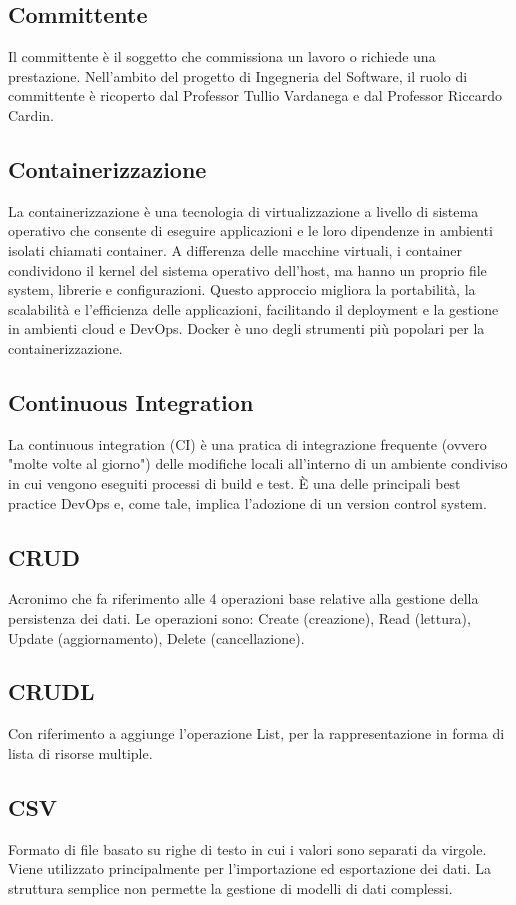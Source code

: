 \vspace{2em}
\subsection*{Committente}
Il committente è il soggetto che commissiona un lavoro o richiede una prestazione. Nell’ambito del progetto di Ingegneria del Software, il ruolo di committente è ricoperto dal Professor Tullio Vardanega e dal Professor Riccardo Cardin.

\vspace{2em}
\subsection*{Containerizzazione}
La containerizzazione è una tecnologia di virtualizzazione a livello di sistema operativo che consente di eseguire applicazioni e le loro dipendenze in ambienti isolati chiamati container. A differenza delle macchine virtuali, i container condividono il kernel del sistema operativo dell'host, ma hanno un proprio file system, librerie e configurazioni. Questo approccio migliora la portabilità, la scalabilità e l'efficienza delle applicazioni, facilitando il deployment e la gestione in ambienti cloud e DevOps. Docker è uno degli strumenti più popolari per la containerizzazione.

\vspace{2em}
\subsection*{Continuous Integration}
La continuous integration (CI) è una pratica di integrazione frequente (ovvero "molte volte al giorno") delle modifiche locali all'interno di un ambiente condiviso in cui vengono eseguiti processi di build e test. È una delle principali best practice DevOps e, come tale, implica l'adozione di un version control system.

\vspace{2em}
\subsection*{CRUD}
Acronimo che fa riferimento alle 4 operazioni base relative alla gestione della persistenza dei dati. Le operazioni sono: Create (creazione), Read (lettura), Update (aggiornamento), Delete (cancellazione).

\vspace{2em}
\subsection*{CRUDL}
\par Con riferimento a  aggiunge l'operazione List, per la rappresentazione in forma di lista di risorse multiple.

\vspace{2em}
\subsection*{CSV}
Formato di file basato su righe di testo in cui i valori sono separati da virgole. Viene utilizzato principalmente per l'importazione ed esportazione dei dati. La struttura semplice non permette la gestione di modelli di dati complessi.
